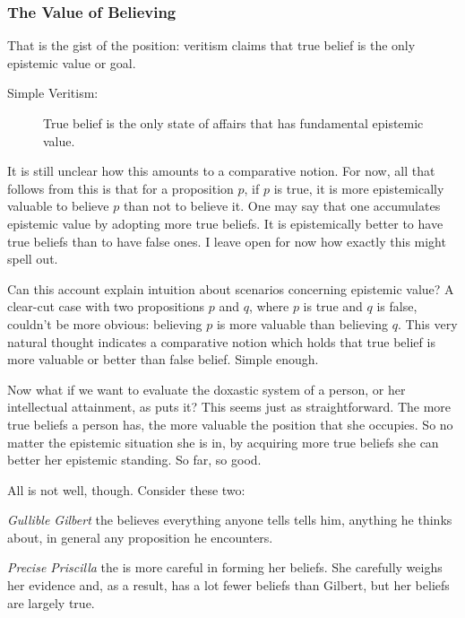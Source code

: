 \documentclass[12pt,numbers=noenddot]{scrartcl}
\begin{document}
\subsubsection{The Value of Believing}
That is the gist of the position: veritism claims that true belief is the only epistemic value or goal.

\begin{description}
    \item[Simple Veritism:] True belief is the only state of affairs that has fundamental epistemic value.
\end{description}

It is still unclear how this amounts to a comparative notion. For now, all that follows from this is that for a proposition $p$, if $p$ is true, it is more epistemically valuable to believe $p$ than not to believe it. One may say that one accumulates epistemic value by adopting more true beliefs. It is epistemically better to have true beliefs than to have false ones. I leave open for now how exactly this might spell out.

Can this account explain intuition about scenarios concerning epistemic value?  A clear-cut case with two propositions $p$ and $q$, where $p$ is true and $q$ is false, couldn't be more obvious: believing $p$ is more valuable than believing $q$. This very natural thought indicates a comparative notion which holds that true belief is more valuable or better than false belief. Simple enough.

Now what if we want to evaluate the doxastic system of a person, or her intellectual attainment, as \textcite[58]{Goldman2002-GOLTUO-2} puts it? This seems just as straightforward. The more true beliefs a person has, the more valuable the position that she occupies. So no matter the epistemic situation she is in, by acquiring more true beliefs she can better her epistemic standing. So far, so good.

All is not well, though. Consider these two:
\begin{description}
    \item \emph{Gullible Gilbert} the believes everything anyone tells tells him, anything he thinks about, in general any proposition he encounters.
    \item \emph{Precise Priscilla} the is more careful in forming her beliefs. She carefully weighs her evidence and, as a result, has a lot fewer beliefs than Gilbert, but her beliefs are largely true.
\end{description}
\end{document}
